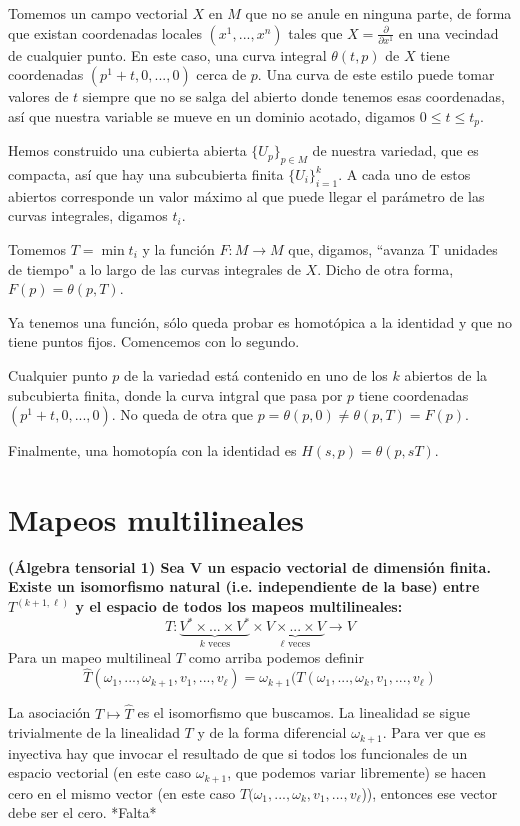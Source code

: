 \documentclass[11pt]{article}
\begin{document}
	Tomemos un campo vectorial $X$ en $M$ que no se anule en ninguna parte, de forma que existan coordenadas locales $(x^1,...,x^n)$ tales que  $X=\frac{\partial }{\partial x^1}$ en una vecindad de cualquier punto. En este caso, una curva integral $\theta(t,p)$ de $X$ tiene coordenadas $(p^1+t,0,...,0)$ cerca de $p$. Una curva de este estilo puede tomar valores de $t$ siempre que no se salga del abierto donde tenemos esas coordenadas, así que nuestra variable se mueve en un dominio acotado, digamos $0\leq t\leq t_p$.\par
	Hemos construido una cubierta abierta $\{U_p\}_{p\in M}$ de nuestra variedad, que es compacta, así que hay una subcubierta finita $\{U_i\}_{i=1}^{k}$. A cada uno de estos abiertos corresponde un valor máximo al que puede llegar el parámetro de las curvas integrales, digamos $t_i$.\par
	Tomemos $T=\min t_i$ y la función $F:M\longrightarrow M$ que, digamos, ``avanza T unidades de tiempo" a lo largo de las curvas integrales de $X$. Dicho de otra forma, $F(p)=\theta(p,T)$.\par
	Ya tenemos una función, sólo queda probar es homotópica a la identidad y que no tiene puntos fijos. Comencemos con lo segundo.\par
	Cualquier punto $p$ de la variedad está contenido en uno de los $k$ abiertos de la subcubierta finita, donde la curva intgral que pasa por $p$ tiene coordenadas $(p^1+t,0,...,0)$. No queda de otra que $p=\theta(p,0)\neq\theta(p,T)=F(p).$\par
	Finalmente, una homotopía con la identidad es $H(s,p)=\theta(p,sT)$.
	
	\newpage
	
	\section{Mapeos multilineales}
	\textbf{(Álgebra tensorial 1) Sea V un espacio vectorial de dimensión finita. Existe un isomorfismo natural (i.e. independiente de la base) entre $T^{(k+1,\ell)}$ y el espacio de todos los mapeos multilineales:}
	$$T:\underbrace{V^*\times...\times V^*}_{k \text{ veces}}\times \underbrace{V \times ... \times V}_{\ell \text{ veces}}\longrightarrow V$$
	Para un mapeo multilineal $T$ como arriba podemos definir $$\hat{T}(\omega_1,...,\omega_{k+1},v_1,...,v_\ell)=\omega_{k+1}(T(\omega_1,...,\omega_k,v_1,...,v_\ell)$$\par
	La asociación $T\mapsto \hat{T}$ es el isomorfismo que buscamos. La linealidad se sigue trivialmente de la linealidad $T$ y de la forma diferencial $\omega_{k+1}$. Para ver que es inyectiva hay que invocar el resultado de que si todos los funcionales de un espacio vectorial (en este caso $\omega_{k+1}$, que podemos variar libremente) se hacen cero en el mismo vector (en este caso $T(\omega_1,...,\omega_k,v_1,...,v_\ell$)), entonces ese vector debe ser el cero. *Falta*
	\newpage
\end{document}
